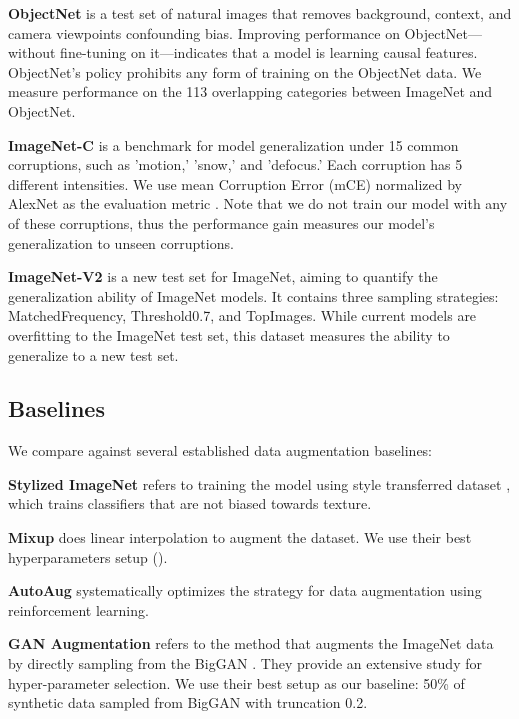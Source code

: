 \documentclass[final]{cvpr}
\begin{document}
\textbf{ObjectNet} \cite{Objectnet} is a test set of natural images that removes background, context, and camera viewpoints confounding bias. Improving performance on ObjectNet---without fine-tuning on it---indicates that a model is learning causal features. ObjectNet's policy prohibits any form of training on the ObjectNet data. We measure performance on the 113 overlapping categories between ImageNet and ObjectNet. 
 
\textbf{ImageNet-C} \cite{imgnet-C} is a benchmark for model generalization under 15 common corruptions, such as 'motion,' 'snow,' and 'defocus.' Each corruption has 5 different intensities. We use mean Corruption Error (mCE) normalized by AlexNet as the evaluation metric \cite{imgnet-C}. Note that we do not train our model with any of these corruptions, thus the performance gain measures our model's generalization to unseen corruptions.
 
\textbf{ImageNet-V2} \cite{ImageNetOverfit} is a new test set for ImageNet, aiming to quantify the generalization ability of ImageNet models. It contains three sampling strategies: MatchedFrequency, Threshold0.7, and TopImages. While current models are overfitting to the ImageNet test set, this dataset measures the ability to generalize to a new test set.










\subsection{Baselines}
We compare against several established data augmentation baselines:

\textbf{Stylized ImageNet} refers to training the model using style transferred dataset \cite{imagenetbiased}, which trains classifiers that are not biased towards texture.

\textbf{Mixup} \cite{zhang2017mixup} does linear interpolation to augment the dataset. We use their best hyperparameters setup ().

\textbf{AutoAug} \cite{cubuk2018autoaugment} systematically optimizes the strategy for data augmentation using reinforcement learning.

\textbf{GAN Augmentation} refers to the method that augments the ImageNet data by directly sampling from the BigGAN \cite{CAS}. They provide  an extensive study for hyper-parameter selection. We use their best setup as our baseline: 50\% of synthetic data sampled from BigGAN with truncation 0.2. 
\end{document}
